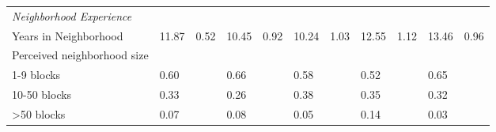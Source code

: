 \begin{sidewaystable}[ht]
\begin{tabular}{lR{.4in}R{.4in}R{.4in}R{.4in}R{.4in}R{.4in}R{.4in}R{.4in}R{.4in}R{.4in}}
  \emph{Neighborhood Experience}\\Years in Neighborhood & 11.87 & 0.52 & 10.45 & 0.92 & 10.24 & 1.03 & 12.55 & 1.12 & 13.46 & 0.96 \\ 
  Perceived neighborhood size\\1-9 blocks &  0.60 &  & 0.66 &  & 0.58 &  & 0.52 &  & 0.65 &  \\ 
  10-50 blocks &  0.33 &  & 0.26 &  & 0.38 &  & 0.35 &  & 0.32 &  \\ 
  >50 blocks &  0.07 &  & 0.08 &  & 0.05 &  & 0.14 &  & 0.03 &  \\ 
   \bottomrule
\end{tabular}
\end{sidewaystable}
